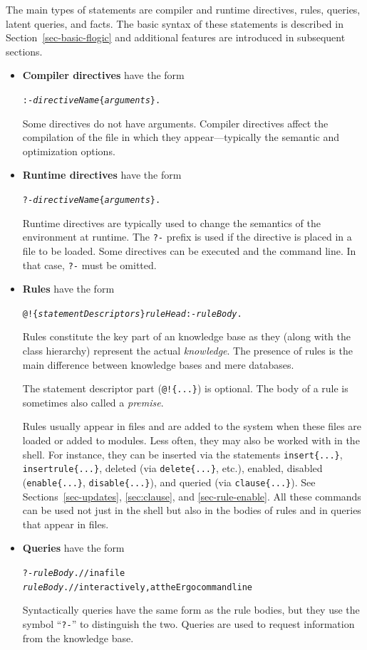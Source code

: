 \documentclass[11pt]{article}
\newcommand{\ERGO}{\mbox{\smaller{\ensuremath{\cal{E}}\smaller{{\sc{RGO}}}}}\xspace}
\newcommand{\FLSYSTEM}{\ERGO}
\begin{document}
The main types of \FLSYSTEM statements are compiler and runtime directives,
rules, queries, latent queries, and facts. The basic syntax of these
statements is described in Section~\ref{sec-basic-flogic} and additional
features are introduced in subsequent sections.
\begin{itemize}
\item  \textbf{Compiler directives} have the form
\begin{alltt}
     :- \emph{directiveName}\{\emph{arguments}\}. 
\end{alltt}
  Some directives do not have arguments. Compiler directives affect the
  compilation of the file in which they appear---typically the
  semantic and optimization options.
\item \textbf{Runtime directives} have the form
\begin{alltt}
     ?- \emph{directiveName}\{\emph{arguments}\}. 
\end{alltt}
  Runtime directives are typically used to change the semantics of the
  environment at runtime.
  The \texttt{?-} prefix is used if the directive is placed in a file to be
  loaded. Some directives can be executed and the \ERGO command line.
  In that case, \texttt{?-} must be omitted.
\item \textbf{Rules} have the form
\begin{alltt}
     @!\{\emph{statementDescriptors}\}  \emph{ruleHead}  :-  \emph{ruleBody}. 
\end{alltt}
  Rules constitute the key part of an \FLSYSTEM knowledge base
  as they (along with the class hierarchy)
  represent the actual \emph{knowledge}.
  The presence of rules is the main difference between knowledge bases and
  mere databases.

  The statement descriptor part
  (\texttt{@!\{...\}})  is optional. The body of a rule is sometimes also
  called a \emph{premise}. 

  Rules usually appear in files and are added to the system when these
  files are loaded or added to modules. Less often,
  they may also be worked with in the \FLSYSTEM shell.
  For instance, they can be inserted via the
  statements \texttt{insert\{...\}}, \texttt{insertrule\{...\}}, 
  deleted (via \texttt{delete\{...\}}, etc.), enabled, disabled
  (\texttt{enable\{...\}}, \texttt{disable\{...\}}),
  and queried (via \texttt{clause\{...\}}).
  See Sections~\ref{sec-updates}, \ref{sec:clause}, and \ref{sec-rule-enable}.
  All these commands can be used not just in the shell but also in the
  bodies of rules and in queries that appear in files.
\item \textbf{Queries} have the form
\begin{alltt}
     ?- \emph{ruleBody}.   // in a file \\
     \emph{ruleBody}.      // interactively, at the Ergo command line
\end{alltt}
  Syntactically queries have the same form as the rule bodies, but they use
  the symbol ``\texttt{?-}''  to distinguish the two. Queries are
  used to request information from the knowledge base.


\end{itemize}
\end{document}
